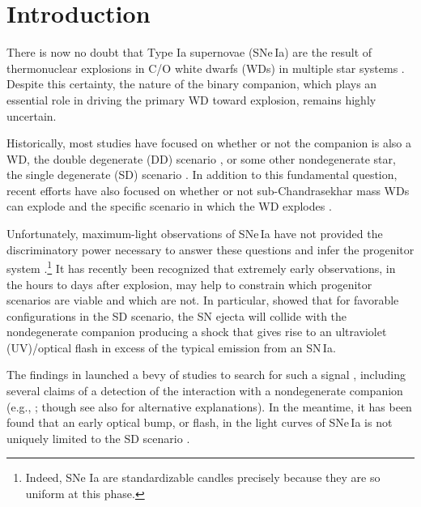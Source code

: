 \documentclass[twocolumn]{aastex63}
\begin{document}
\section{Introduction}

There is now no doubt that Type Ia supernovae (SNe\,Ia) are the result of
thermonuclear explosions in C/O white dwarfs (WDs) in multiple star systems
\citep[see, e.g.,][and references therein]{Maoz14}. Despite this certainty,
the nature of the binary companion, which plays an essential role in driving
the primary WD toward explosion, remains highly uncertain.

Historically, most studies have focused on whether or not the companion is
also a WD, the double degenerate (DD) scenario \citep[e.g.,][]{Webbink84}, or
some other nondegenerate star, the single degenerate (SD) scenario
\citep[e.g.,][]{Whelan73}. In addition to this fundamental question, recent
efforts have also focused on whether or not sub-Chandrasekhar mass WDs can
explode \citep[e.g.,][]{Fink10,Scalzo14a,Shen14,Polin19,Gronow20} and the
specific scenario in which the WD explodes \citep[see][and references
therein]{Hillebrandt13,Ropke18}.

Unfortunately, maximum-light observations of SNe\,Ia have not provided the
discriminatory power necessary to answer these questions and infer the
progenitor system \citep[e.g.,][]{Ropke12}.\footnote{Indeed, SNe Ia are
standardizable candles precisely because they are so uniform at this phase.}
It has recently been recognized that extremely early observations, in the
hours to days after explosion, may help to constrain which progenitor
scenarios are viable and which are not. In particular, \citet{Kasen10a} showed
that for favorable configurations in the SD scenario, the SN ejecta will
collide with the nondegenerate companion producing a shock that gives rise to
an ultraviolet (UV)/optical flash in excess of the typical emission from an
SN\,Ia.

The findings in \citet{Kasen10a} launched a bevy of studies to search for such
a signal \citep[e.g.,][]{Hayden10,Bianco11,Ganeshalingam11,Nugent11,Olling15},
including several claims of a detection of the interaction with a
nondegenerate companion (e.g.,
\citealt{Cao15,Marion16,Hosseinzadeh17,Dimitriadis19}; though see also
\citealt{Kromer16,Jiang18,Shappee18,Shappee19} for alternative explanations).
In the meantime, it has been found that an early optical bump, or flash, in
the light curves of SNe\,Ia is not uniquely limited to the SD scenario
\citep[e.g.,][]{Raskin13,Piro16,Jiang17,Levanon17,Noebauer17,Maeda18,De19,
Polin19, Magee20a}.
\end{document}

